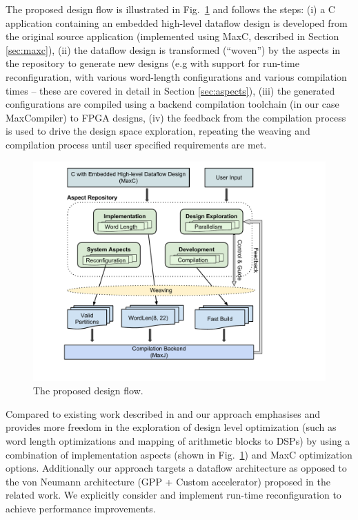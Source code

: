 The proposed design flow is illustrated in Fig.~\ref{fig:design-flow} and follows the steps: (i) a C application
containing an embedded high-level dataflow design is developed from
the original source application (implemented using MaxC, described in
Section \ref{sec:maxc}), (ii) the dataflow design is transformed
(``woven'') by the aspects in the repository to generate new designs
(e.g with support for run-time reconfiguration, with various
word-length configurations and various compilation times -- these are
covered in detail in Section \ref{sec:aspects}), (iii) the generated
configurations are compiled using a backend compilation toolchain (in
our case MaxCompiler) to FPGA designs, (iv) the feedback from the
compilation process is used to drive the design space exploration,
repeating the weaving and compilation process until user specified
requirements are met.

\begin{figure}[!h]
  \includegraphics[scale=0.51, trim=72 50 0 0]{figs/design-flow}
  \caption{The proposed design flow.}
  \label{fig:design-flow}
\end{figure}

Compared to existing work described in
\cite{Cardoso:Teixeira:Alves:Nobre:Diniz:Cutinho:Luk:2012} and
\cite{cardoso2011new} our approach emphasises and provides more
freedom in the exploration of design level optimization (such as word
length optimizations and mapping of arithmetic blocks to DSPs) by
using a combination of implementation aspects (shown in Fig.~\ref{fig:design-flow}) and MaxC optimization options.  Additionally
our approach targets a dataflow architecture as opposed to the von
Neumann architecture (GPP + Custom accelerator) proposed in the
related work. We explicitly consider and implement run-time
reconfiguration to achieve performance improvements. 
